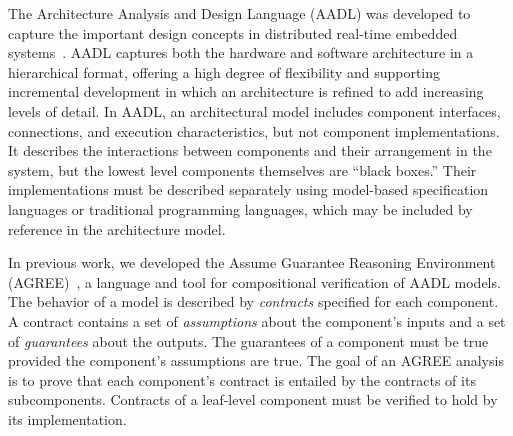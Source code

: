 The Architecture Analysis and Design Language (AADL) was developed to capture the important 
design concepts in distributed real-time embedded systems~\cite{FeilerModelBasedEngineering2012}. 
AADL captures both the hardware and software architecture in a hierarchical format,  
offering a high degree of flexibility and supporting incremental development 
in which an architecture is refined to add increasing levels of detail.
%
In AADL, an architectural model includes component interfaces, connections, and execution characteristics, but not component implementations. It describes the interactions between components and their arrangement in the system, but the lowest level 
components themselves are ``black boxes.'' Their implementations must be described separately using model-based specification languages or traditional programming languages, which may be included by reference in the architecture model.  

In previous work, we developed the Assume Guarantee Reasoning Environment (AGREE)~\cite{8625938}, a language and tool for compositional verification of AADL models.  The behavior of a model is described by {\em contracts} specified for each component.  A contract contains a set of {\em assumptions} about the component's inputs and a set of {\em guarantees} about the outputs.  The guarantees of a component must be true provided the component's assumptions are true.  The goal of an AGREE analysis is to prove that each component's contract is entailed by the contracts of its subcomponents.  Contracts of a leaf-level component must be verified to hold by its implementation.  

